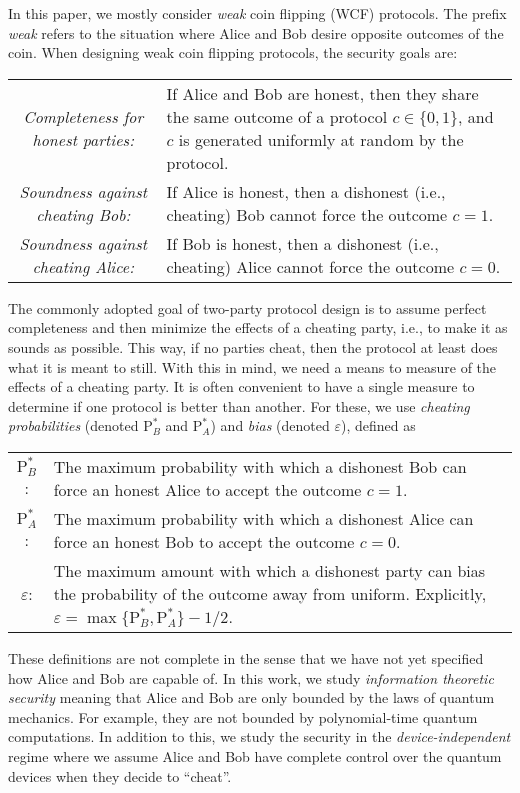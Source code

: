 \documentclass[11pt]{article}
\newcommand{\eps}{\varepsilon}
\newcommand{\PB}{\mathrm{P}_B^*}
\newcommand{\PA}{\mathrm{P}_A^*}
\begin{document}
In this paper, we mostly consider \emph{weak} coin flipping (WCF) protocols. 
The prefix \emph{weak} refers to the situation where Alice and Bob desire opposite outcomes of the coin. 
When designing weak coin flipping protocols, the security goals are: 
\begin{center} 
\begin{tabularx}{\textwidth}{cX}
\emph{Completeness for honest parties:} & If Alice and Bob are honest, then they share the same outcome of a protocol $c \in \{ 0, 1 \}$, and $c$ is generated uniformly at random by the protocol. \\ 
\emph{Soundness against cheating Bob:} & If Alice is honest, then a dishonest (i.e., cheating) Bob cannot force the outcome $c = 1$. \\ 
\emph{Soundness against cheating Alice:} & If Bob is honest, then a dishonest (i.e., cheating) Alice cannot force the outcome $c = 0$. 
\end{tabularx} 
\end{center}  

The commonly adopted goal of two-party protocol design is to assume perfect completeness and then minimize the effects of a cheating party, i.e., to make it as sounds as possible. 
This way, if no parties cheat, then the protocol at least does what it is meant to still. 
With this in mind, we need a means to measure of the effects of a cheating party. 
It is often convenient to have a single measure to determine if one protocol is better than another. 
For these, we use \emph{cheating probabilities} (denoted $\PB$ and $\PA$) and \emph{bias} (denoted $\eps$), defined as 
\begin{center} 
\begin{tabularx}{\textwidth}{cX}
$\PB$: & The maximum probability with which a dishonest Bob can force an honest Alice to accept the outcome $c = 1$. \\ 
$\PA$: & The maximum probability with which a dishonest Alice can force an honest Bob to accept the outcome $c = 0$. \\ 
$\eps$: & The maximum amount with which a dishonest party can bias the probability of the outcome away from uniform. Explicitly, $\eps = \max \{ \PB, \PA \} - 1/2$. \\ 
\end{tabularx} 
\end{center}  

These definitions are not complete in the sense that we have not yet specified how Alice and Bob are capable of. 
In this work, we study \emph{information theoretic security} meaning that Alice and Bob are only bounded by the laws of quantum mechanics. 
For example, they are not bounded by polynomial-time quantum computations. 
In addition to this, we study the security in the \emph{device-independent} regime where we assume Alice and Bob have complete control over the quantum devices when they decide to ``cheat''. 
\end{document}

